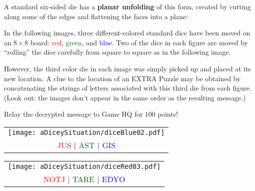 

\begin{puzzle}
  A standard six-sided die has a \textbf{planar unfolding} of this form,
  created by cutting along some of the edges and flattening the faces into
  a plane:

  \vfill


  \vfill

  In the following images, three different-colored standard dice have been
  moved on an $8\times 8$ board:
    \textcolor{red}{red},
    \textcolor{darkGreen}{green}, and
    \textcolor{blue}{blue}.
  Two of the dice in each figure are moved by ``rolling'' the dice carefully
  from square to square as in the following image.

  \vfill


  \vfill

  However, the third color die in each image was simply picked up
  and placed at its new location. A clue to the location of an
  EXTRA Puzzle may
  be obtained by concatenating the strings of letters associated with this
  third die from each figure. (Look out: the images don't appear in the
  same order as the resulting message.)

  Relay the decrypted message to Game HQ for \(100\) points!

  \vfill

  \newpage



  \begin{center}
    \begin{tabular}{c}
      \texttt{[image: aDiceySituation/diceBlue02.pdf]}
      \\
      \textcolor{red}{JUS} |
      \textcolor{darkGreen}{AST} |
      \textcolor{blue}{GIS}
    \end{tabular}
  \end{center}


  \vfill


  \begin{center}
    \begin{tabular}{c}
      \texttt{[image: aDiceySituation/diceRed03.pdf]}
      \\
      \textcolor{red}{NOTJ} |
      \textcolor{darkGreen}{TARE} |
      \textcolor{blue}{EDYO}
    \end{tabular}
  \end{center}



\end{puzzle}
